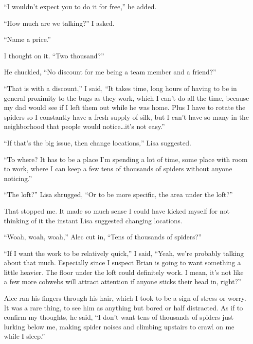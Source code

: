 ``I wouldn't expect you to do it for free,'' he added.



``How much are we talking?'' I asked.



``Name a price.''



I thought on it.  ``Two thousand?''



He chuckled, ``No discount for me being a team member and a friend?''



``That is with a discount,'' I said, ``It takes time, long hours of having to be in general proximity to the bugs as they work, which I can't do all the time, because my dad would see if I left them out while he was home.  Plus I have to rotate the spiders so I constantly have a fresh supply of silk, but I can't have so many in the neighborhood that people would notice\ldots it's not easy.''



``If that's the big issue, then change locations,'' Lisa suggested.



``To where?  It has to be a place I'm spending a lot of time, some place with room to work, where I can keep a few tens of thousands of spiders without anyone noticing.''



``The loft?'' Lisa shrugged, ``Or to be more specific, the area under the loft?''



That stopped me.  It made so much sense I could have kicked myself for not thinking of it the instant Lisa suggested changing locations.



``Woah, woah, woah,'' Alec cut in, ``Tens of thousands of spiders?''



``If I want the work to be relatively quick,'' I said, ``Yeah, we're probably talking about that much.  Especially since I suspect Brian is going to want something a little heavier. The floor under the loft could definitely work.  I mean, it's not like a few more cobwebs will attract attention if anyone sticks their head in, right?''



Alec ran his fingers through his hair, which I took to be a sign of stress or worry.  It was a rare thing, to see him as anything but bored or half distracted.  As if to confirm my thoughts, he said, ``I don't want tens of thousands of spiders just lurking below me, making spider noises and climbing upstairs to crawl on me while I sleep.''



